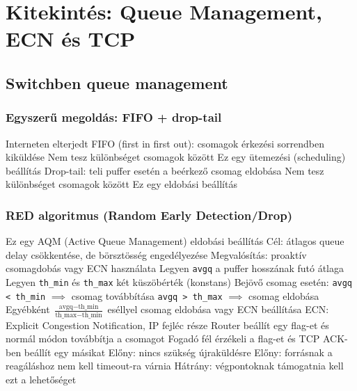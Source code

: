 \documentclass[12pt,a4paper]{article}
\begin{document}
\pagebreak

\section{Kitekintés: Queue Management, ECN és TCP}

\subsection{Switchben queue management}

\subsubsection{Egyszerű megoldás: FIFO + drop-tail}

\begin{outline}
	\1 Interneten elterjedt
	\1 FIFO (first in first out): csomagok érkezési sorrendben kiküldése
		\2 Nem tesz különbséget csomagok között
		\2 Ez egy ütemezési (scheduling) beállítás
	\1 Drop-tail: teli puffer esetén a beérkező csomag eldobása
		\2 Nem tesz különbséget csomagok között
		\2 Ez egy eldobási beállítás
\end{outline}

\subsubsection{RED algoritmus (Random Early Detection/Drop)}

\begin{outline}
	\1 Ez egy AQM (Active Queue Management) eldobási beállítás
		\2 Cél: átlagos queue delay csökkentése, de börsztösség engedélyezése
		\2 Megvalósítás: proaktív csomagdobás vagy ECN használata
	\1 Legyen \texttt{avgq} a puffer hosszának futó átlaga
	\1 Legyen \texttt{th\_min} és \texttt{th\_max} két küszöbérték (konstans)
	\1 Bejövő csomag esetén:
		\2 \texttt{avgq < th\_min} $\implies$ csomag továbbítása
		\2 \texttt{avgq > th\_max} $\implies$ csomag eldobása
		\2 Egyébként $\frac{\text{avgq}-\text{th\_min}}{\text{th\_max}-\text{th\_min}}$ eséllyel csomag eldobása vagy ECN beállítása
	\1 ECN: Explicit Congestion Notification, IP fejléc része
		\2 Router beállít egy flag-et és normál módon továbbítja a csomagot
		\2 Fogadó fél érzékeli a flag-et és TCP ACK-ben beállít egy másikat
		\2 Előny: nincs szükség újraküldésre
		\2 Előny: forrásnak a reagáláshoz nem kell timeout-ra várnia
		\2 Hátrány: végpontoknak támogatnia kell ezt a lehetőséget
\end{outline}
\end{document}
